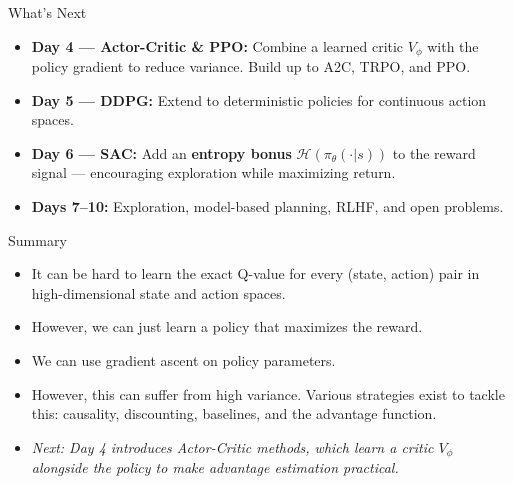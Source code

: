 \begin{frame}{What's Next}
    \begin{itemize}
        \item \textbf{Day 4 --- Actor-Critic \& PPO:} Combine a learned critic $V_\phi$ with the policy gradient to reduce variance. Build up to A2C, TRPO, and PPO.
        \item \textbf{Day 5 --- DDPG:} Extend to deterministic policies for continuous action spaces.
        \item \textbf{Day 6 --- SAC:} Add an \textbf{entropy bonus} $\mathcal{H}(\pi_\theta(\cdot|s))$ to the reward signal --- encouraging exploration while maximizing return.
        \item \textbf{Days 7--10:} Exploration, model-based planning, RLHF, and open problems.
    \end{itemize}
\end{frame}

\begin{frame}{Summary}
\begin{itemize}
    \item It can be hard to learn the exact Q-value for every (state, action) pair in high-dimensional state and action spaces.
    \item However, we can just learn a policy that maximizes the reward.
    \item We can use gradient ascent on policy parameters.
    \item However, this can suffer from high variance. Various strategies exist to tackle this: causality, discounting, baselines, and the advantage function.
    \item \textit{Next: Day 4 introduces Actor-Critic methods, which learn a critic $V_\phi$ alongside the policy to make advantage estimation practical.}
\end{itemize}
\end{frame}